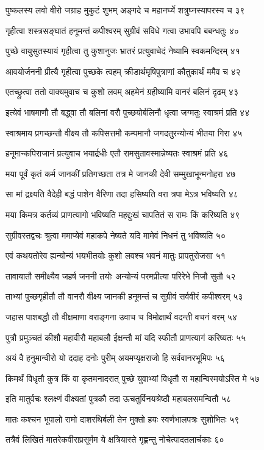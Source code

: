 पुष्कलस्य लवो वीरो जग्राह मुकुटं शुभम्
अङ्गदे च महानर्घ्ये शत्रुघ्नस्यापरस्य च ३९

गृहीत्वा शस्त्रसङ्घातं हनूमन्तं कपीश्वरम्
सुग्रीवं सविधे गत्वा उभावपि बबन्धतुः ४०

पुच्छे वायुसुतस्यायं गृहीत्वा तु कुशानुजः
भ्रातरं प्रत्युवाचेदं नेष्यामि स्वकमन्दिरम् ४१

आवयोर्जननी प्रीत्यै गृहीत्वा पुच्छके त्वहम्
क्रीडार्थमृषिपुत्राणां कौतुकार्थं ममैव च ४२

एतच्छ्रुत्वा ततो वाक्यमुवाच च कुशो लवम्
अहमेनं ग्रहीष्यामि वानरं बलिनं दृढम् ४३

इत्येवं भाषमाणौ तौ बद्ध्वा तौ बलिनां वरौ
पुच्छयोर्बलिनौ धृत्वा जग्मतुः स्वाश्रमं प्रति ४४

स्वाश्रमाय प्रगच्छन्तौ वीक्ष्य तौ कपिसत्तमौ
कम्पमानौ जगदतुरन्योन्यं भीतया गिरा ४५

हनूमान्कपिराजानं प्रत्युवाच भयार्द्रधीः
एतौ रामसुतावस्मान्नेष्यतः स्वाश्रमं प्रति ४६

मया पूर्वं कृतं कर्म जानकीं प्रतिगच्छता
तत्र मे जानकी देवी सम्मुखाभून्मनोहरा ४७

सा मां द्रक्ष्यति वैदेही बद्धं पाशेन वैरिणा
तदा हसिष्यति वरा त्रपा मेऽत्र भविष्यति ४८

मया किमत्र कर्तव्यं प्राणत्यागो भविष्यति
महद्दुःखं चापतितं स रामः किं करिष्यति ४९

सुग्रीवस्तद्वचः श्रुत्वा ममाप्येवं महाकपे
नेष्यते यदि मामेवं निधनं तु भविष्यति ५०

एवं कथयतोरेव ह्यन्योन्यं भयभीतयोः
कुशो लवश्च भवनं मातुः प्रापतुरोजसा ५१

तावायातौ समीक्ष्यैव जहर्ष जननी तयोः
अन्योन्यं परमप्रीत्या परिरेभे निजौ सुतौ ५२

ताभ्यां पुच्छगृहीतौ तौ वानरौ वीक्ष्य जानकी
हनूमन्तं च सुग्रीवं सर्ववीरं कपीश्वरम् ५३

जहास पाशबद्धौ तौ वीक्षमाणा वराङ्गना
उवाच च विमोक्षार्थं वदन्ती वचनं वरम् ५४

पुत्रौ प्रमुञ्चतं कीशौ महावीरौ महाबलौ
ईक्षन्तौ मां यदि स्फीतौ प्राणत्यागं करिष्यतः ५५

अयं वै हनुमान्वीरो यो ददाह दनोः पुरीम्
अयमप्यृक्षराजो हि सर्ववानरभूमिपः ५६

किमर्थं विधृतौ कुत्र किं वा कृतमनादरात्
पुच्छे युवाभ्यां विधृतौ स महान्विस्मयोऽस्ति मे ५७

इति मातुर्वचः श्लक्ष्णं वीक्ष्यतां पुत्रकौ तदा
ऊचतुर्विनयश्रेष्ठौ महाबलसमन्वितौ ५८

मातः कश्चन भूपालो रामो दाशरथिर्बली
तेन मुक्तो हयः स्वर्णभालपत्रः सुशोभितः ५९

तत्रैवं लिखितं मातरेकवीराप्रसूर्मम
ये क्षत्रियास्ते गृह्णन्तु नोचेत्पादतलार्चकाः ६०

